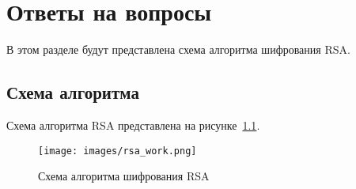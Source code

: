 \chapter{Ответы на вопросы}

В этом разделе будут представлена схема алгоритма шифрования RSA.

\section{Схема алгоритма}

Схема алгоритма RSA представлена на рисунке~\ref{img:rsa_work}.

\begin{figure}[ht!]
	\centering
	\texttt{[image: images/rsa\_work.png]}
	\caption{Схема алгоритма шифрования RSA}
	\label{img:rsa_work}
\end{figure}